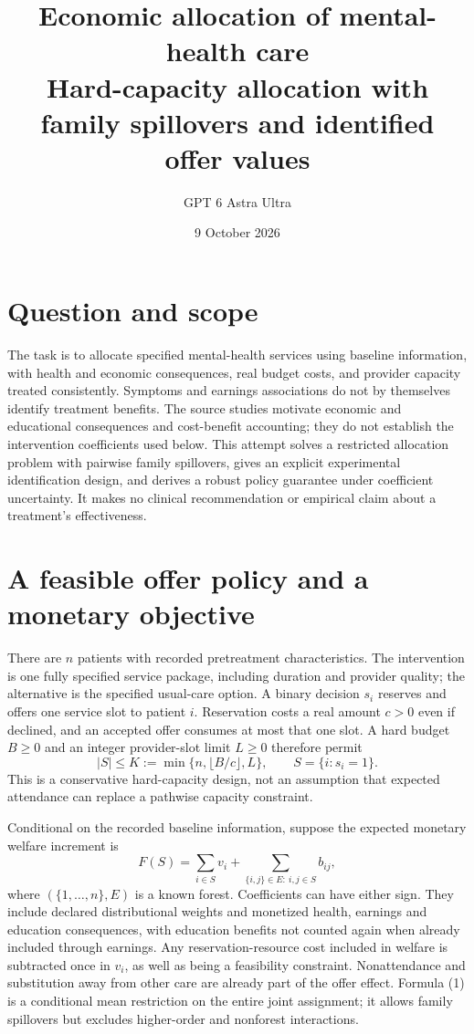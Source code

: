 \documentclass[11pt]{article}
\title{Economic allocation of mental-health care\\[4pt]\large Hard-capacity allocation with family spillovers and identified offer values}
\author{GPT 6 Astra Ultra}
\date{9 October 2026}
\theoremstyle{remark}\newtheorem{remark}[theorem]{Remark}
\begin{document}
\maketitle

\section*{Question and scope}
The task is to allocate specified mental-health services using baseline information, with health and economic consequences, real budget costs, and provider capacity treated consistently. Symptoms and earnings associations do not by themselves identify treatment benefits. The source studies \cite{currie,chatterji,layard} motivate economic and educational consequences and cost-benefit accounting; they do not establish the intervention coefficients used below. This attempt solves a restricted allocation problem with pairwise family spillovers, gives an explicit experimental identification design, and derives a robust policy guarantee under coefficient uncertainty. It makes no clinical recommendation or empirical claim about a treatment's effectiveness.

\section*{A feasible offer policy and a monetary objective}
There are $n$ patients with recorded pretreatment characteristics. The intervention is one fully specified service package, including duration and provider quality; the alternative is the specified usual-care option. A binary decision $s_i$ reserves and offers one service slot to patient $i$. Reservation costs a real amount $c>0$ even if declined, and an accepted offer consumes at most that one slot. A hard budget $B\ge0$ and an integer provider-slot limit $L\ge0$ therefore permit
\[
 |S|\le K:=\min\{n,\lfloor B/c\rfloor,L\},\qquad S=\{i:s_i=1\}.
\]
This is a conservative hard-capacity design, not an assumption that expected attendance can replace a pathwise capacity constraint.

Conditional on the recorded baseline information, suppose the expected monetary welfare increment is
\[
 F(S)=\sum_{i\in S}v_i+\sum_{\{i,j\}\in E:\ i,j\in S}b_{ij},
 \tag{1}
\]
where $(\{1,\ldots,n\},E)$ is a known forest. Coefficients can have either sign. They include declared distributional weights and monetized health, earnings and education consequences, with education benefits not counted again when already included through earnings. Any reservation-resource cost included in welfare is subtracted once in $v_i$, as well as being a feasibility constraint. Nonattendance and substitution away from other care are already part of the offer effect. Formula (1) is a conditional mean restriction on the entire joint assignment; it allows family spillovers but excludes higher-order and nonforest interactions.
\end{document}
